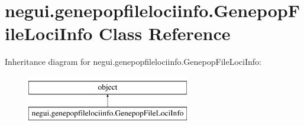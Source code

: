 \hypertarget{classnegui_1_1genepopfilelociinfo_1_1GenepopFileLociInfo}{}\section{negui.\+genepopfilelociinfo.\+Genepop\+File\+Loci\+Info Class Reference}
\label{classnegui_1_1genepopfilelociinfo_1_1GenepopFileLociInfo}
Inheritance diagram for negui.\+genepopfilelociinfo.\+Genepop\+File\+Loci\+Info\+:\begin{figure}[H]
\begin{center}
\leavevmode
\includegraphics[height=2.000000cm]{classnegui_1_1genepopfilelociinfo_1_1GenepopFileLociInfo}
\end{center}
\end{figure}
